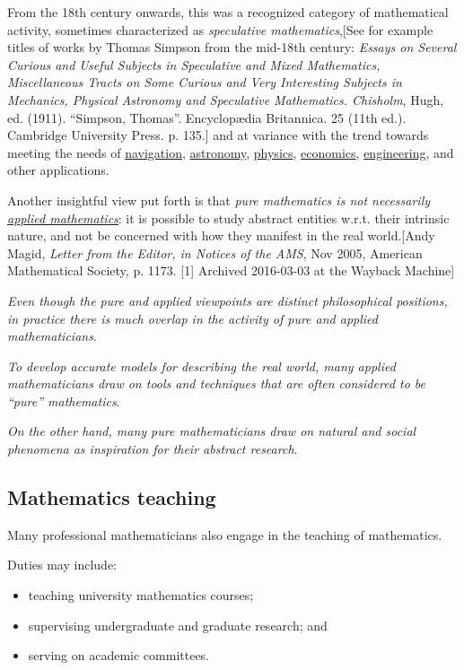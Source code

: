 \documentclass{book}
\numberwithin{equation}{section}
\begin{document}
From the 18th century onwards, this was a recognized category of mathematical activity, sometimes characterized as \textit{speculative mathematics},[See for example titles of works by Thomas Simpson from the mid-18th century: \textit{Essays on Several Curious and Useful Subjects in Speculative and Mixed Mathematics, Miscellaneous Tracts on Some Curious and Very Interesting Subjects in Mechanics, Physical Astronomy and Speculative Mathematics. Chisholm}, Hugh, ed. (1911). ``Simpson, Thomas''. Encyclop\ae dia Britannica. 25 (11th ed.). Cambridge University Press. p. 135.] and at variance with the trend towards meeting the needs of \href{https://en.wikipedia.org/wiki/Navigation}{navigation}, \href{https://en.wikipedia.org/wiki/Astronomy}{astronomy}, \href{https://en.wikipedia.org/wiki/Physics}{physics}, \href{https://en.wikipedia.org/wiki/Economics}{economics}, \href{https://en.wikipedia.org/wiki/Engineering}{engineering}, and other applications.

%
Another insightful view put forth is that \textit{pure mathematics is not necessarily \href{https://en.wikipedia.org/wiki/Applied_mathematics}{applied mathematics}}: it is possible to study abstract entities w.r.t. their intrinsic nature, and not be concerned with how they manifest in the real world.[Andy Magid, \textit{Letter from the Editor, in Notices of the AMS}, Nov 2005, American Mathematical Society, p. 1173. [1] Archived 2016-03-03 at the Wayback Machine]

\textit{Even though the pure and applied viewpoints are distinct philosophical positions, in practice there is much overlap in the activity of pure and applied mathematicians}.

%
\textit{To develop accurate models for describing the real world, many applied mathematicians draw on tools and techniques that are often considered to be ``pure'' mathematics}.

\textit{On the other hand, many pure mathematicians draw on natural and social phenomena as inspiration for their abstract research}.

\subsection{Mathematics teaching}
Many professional mathematicians also engage in the teaching of mathematics.

Duties may include:
\begin{itemize}
    \item teaching university mathematics courses;
    \item supervising undergraduate and graduate research; and
    \item serving on academic committees.
\end{itemize}
\end{document}
